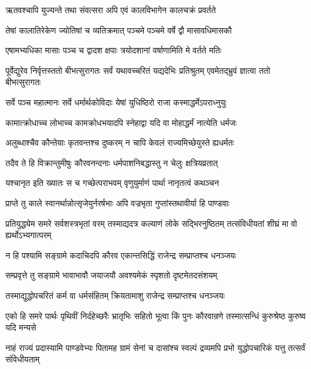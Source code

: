\twolineshloka
{ऋतवश्चापि युज्यन्ते तथा संवत्सरा अपि}
{एवं कालविभागेन कालचक्रं प्रवर्तते}


\twolineshloka
{तेषां कालातिरेकेण ज्योतिषां च व्यतिक्रमात्}
{पञ्चमे पञ्चमे वर्षे द्वौ मासावधिमासकौ}


\twolineshloka
{एषामभ्यधिका मासाः पञ्च च द्वादश क्षपाः}
{त्रयोदशानां वर्षाणामिति मे वर्तते मतिः}


\onelineshloka
{पूर्वेद्युरेव निर्वृत्तस्ततो बीभत्सुरागतः}
\twolineshloka
{सर्वं यथावच्चरितं यद्यदेभिः प्रतिश्रुतम्}
{एवमेतद्भ्रुवं ज्ञात्वा ततो बीभत्सुरागतः}


\twolineshloka
{सर्वे पञ्च महात्मानः सर्वे धर्मार्थकोविदाः}
{येषां युधिष्ठिरो राजा कस्माद्धर्मेऽपराध्नुयुः}


\twolineshloka
{कामात्क्रोधाच्च लोभाच्च कामक्रोधभयादपि}
{स्नेहाद्वा यदि वा मोहाद्धर्मं नात्येति धर्मजः}


\twolineshloka
{अलुब्धाश्चैव कौन्तेयाः कृतवन्तश्च दुष्करम्}
{न चापि केवलं राज्यमिच्छेयुस्ते ह्यधर्मतः}


\twolineshloka
{तदैव ते हि विक्रान्तुमीषुः कौरवनन्दनाः}
{धर्मपाशनिबद्धास्तु न चेलुः क्षत्रियव्रतात्}


\twolineshloka
{यश्चानृत इति ख्यातः स च गच्छेत्पराभवम्}
{वृणुयुर्माणं पार्था नानृतत्वं कथञ्चन}


\twolineshloka
{प्राप्ते तु काले स्वानर्थान्नोत्सृजेयुर्नरर्षभाः}
{अपि वज्रभृता गुप्तांस्तथावीर्या हि पाण्डवाः}


\onelineshloka
{प्रतियुद्ध्येम समरे सर्वशस्त्रभृतां वरम्}
\twolineshloka
{तस्माद्यदत्र कल्याणं लोके सद्भिरनुष्ठितम्}
{तत्संविधीयतां शीघ्रं मा वो ह्यर्थोऽभ्यगात्परम्}


\twolineshloka
{न हि पश्यामि सङ्ग्रामे कदाचिदपि कौरव}
{एकान्तसिद्धिं राजेन्द्र सम्प्राप्तश्च धनञ्जयः}


\twolineshloka
{सम्प्रवृत्ते तु सङ्ग्रामे भावाभावौ जयाजयौ}
{अवश्यमेकं स्पृशतो दृष्टमेतदसंशयम्}


\twolineshloka
{तस्माद्युद्धोपचरितं कर्म वा धर्मसंहितम्}
{क्रियतामाशु राजेन्द्र सम्प्राप्तश्च धनञ्जयः}


\threelineshloka
{एको हि समरे पार्थः पृथिवीं निर्दहेच्छरैः}
{भ्रातृभिः सहितो भूत्वा किं पुनः कौरवान्रणे}
{तस्मात्सन्धिं कुरुश्रेष्ठ कुरुष्व यदि मन्यसे}




\threelineshloka
{नाहं राज्यं प्रदास्यामि पाण्डवेभ्यः पितामह}
{ग्रामं सेनां च दासांश्च स्वल्पं द्रव्यमपि प्रभो}
{युद्धोपचारिकं यत्तु तत्सर्वं संविधीयताम्}


